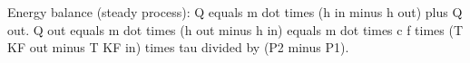 Energy balance (steady process):  
Q equals m dot times (h in minus h out) plus Q out.  
Q out equals m dot times (h out minus h in) equals m dot times c f times (T KF out minus T KF in) times tau divided by (P2 minus P1).
